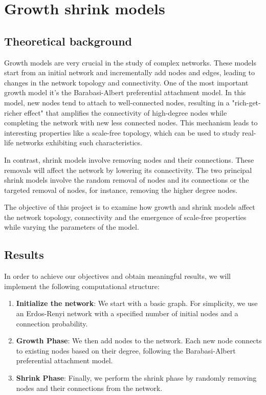 \chapter{Growth shrink models}



\section{Theoretical background}

Growth models are very crucial in the study of complex networks. These models start from an initial network and incrementally add nodes and edges, leading to changes in the network topology and connectivity. One of the most important growth model it's the Barabasi-Albert preferential attachment model. In this model, new nodes tend to attach to well-connected nodes, resulting in a "rich-get-richer effect" that amplifies the connectivity of high-degree nodes while completing the network with new less connected nodes. This mechanism leads to interesting properties like a scale-free topology, which can be used to study real-life networks exhibiting such characteristics.

In contrast, shrink models involve removing nodes and their connections. These removals will affect the network by lowering its connectivity. The two principal shrink models involve the random removal of nodes and its connections or the targeted removal of nodes, for instance, removing the higher degree nodes. 

The objective of this project is to examine how growth and shrink models affect the network topology, connectivity and the emergence of scale-free properties while varying the parameters of the model.

 
\section{Results}



In order to achieve our objectives and obtain meaningful results, we will implement the following computational structure: 
\begin{enumerate}
    \item \textbf{Initialize the network}:  We start with a basic graph. For simplicity, we use an Erdos-Renyi network with a specified number of initial nodes and a connection probability.
    \item \textbf{Growth Phase}: We then add nodes to the network. Each new node connects to existing nodes based on their degree, following the Barabasi-Albert preferential attachment model.
    \item \textbf{Shrink Phase}: Finally, we perform the shrink phase by randomly removing nodes and their connections from the network.
\end{enumerate}

